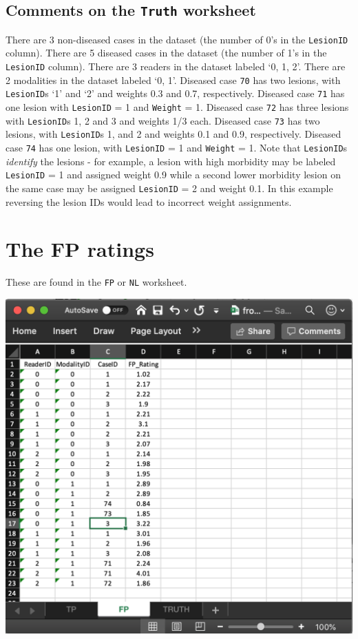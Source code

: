 \documentclass[
]{book}
\begin{document}
\hypertarget{quick-start-froc-truth-comments}{%
\subsection{\texorpdfstring{Comments on the \texttt{Truth} worksheet}{Comments on the Truth worksheet}}\label{quick-start-froc-truth-comments}}

There are 3 non-diseased cases in the dataset (the number of 0's in the \texttt{LesionID} column). There are 5 diseased cases in the dataset (the number of 1's in the \texttt{LesionID} column). There are 3 readers in the dataset labeled `0, 1, 2'. There are 2 modalities in the dataset labeled `0, 1'. Diseased case \texttt{70} has two lesions, with \texttt{LesionID}s `1' and `2' and weights 0.3 and 0.7, respectively. Diseased case \texttt{71} has one lesion with \texttt{LesionID} = 1 and \texttt{Weight} = 1. Diseased case \texttt{72} has three lesions with \texttt{LesionID}s 1, 2 and 3 and weights 1/3 each. Diseased case \texttt{73} has two lesions, with \texttt{LesionID}s 1, and 2 and weights 0.1 and 0.9, respectively. Diseased case \texttt{74} has one lesion, with \texttt{LesionID} = 1 and \texttt{Weight} = 1. Note that \texttt{LesionID}s \emph{identify} the lesions - for example, a lesion with high morbidity may be labeled \texttt{LesionID} = 1 and assigned weight 0.9 while a second lower morbidity lesion on the same case may be assigned \texttt{LesionID} = 2 and weight 0.1. In this example reversing the lesion IDs would lead to incorrect weight assignments.

\hypertarget{quick-start-froc-data-fp}{%
\section{The FP ratings}\label{quick-start-froc-data-fp}}

These are found in the \texttt{FP} or \texttt{NL} worksheet.

\includegraphics[width=1\textwidth,height=\textheight]{images/quick-start/frocCrNL.png}
\end{document}
